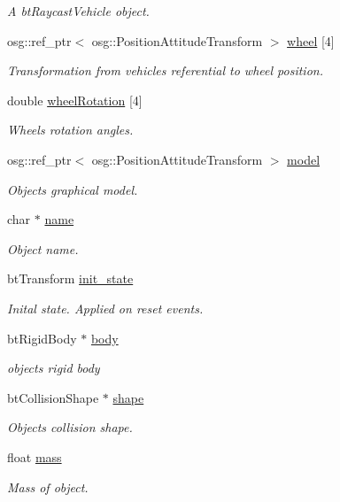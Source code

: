 \begin{DoxyCompactItemize}
\begin{DoxyCompactList}\small\item\em A bt\+Raycast\+Vehicle object. \end{DoxyCompactList}\item 
osg\+::ref\+\_\+ptr$<$ osg\+::\+Position\+Attitude\+Transform $>$ \mbox{\hyperlink{classbtosgVehicle_a37edb4c28551037829ffd79c7bc315ba}{wheel}} \mbox{[}4\mbox{]}
\begin{DoxyCompactList}\small\item\em Transformation from vehicle\textquotesingle{}s referential to wheel position. \end{DoxyCompactList}\item 
double \mbox{\hyperlink{classbtosgVehicle_a0a9cd6f2c9b0defc44cd5e2e8d597418}{wheel\+Rotation}} \mbox{[}4\mbox{]}
\begin{DoxyCompactList}\small\item\em Wheels\textquotesingle{} rotation angles. \end{DoxyCompactList}\item 
osg\+::ref\+\_\+ptr$<$ osg\+::\+Position\+Attitude\+Transform $>$ \mbox{\hyperlink{classbtosgObject_afd15726e7a214212d6d5815f8ac1ac6c}{model}}
\begin{DoxyCompactList}\small\item\em Object\textquotesingle{}s graphical model. \end{DoxyCompactList}\item 
char $\ast$ \mbox{\hyperlink{classbtosgObject_a12396e1362797a75473a2e833b579cc9}{name}}
\begin{DoxyCompactList}\small\item\em Object name. \end{DoxyCompactList}\item 
bt\+Transform \mbox{\hyperlink{classbtosgObject_a2dee023f311114e200df9b04c8c1b400}{init\+\_\+state}}
\begin{DoxyCompactList}\small\item\em Inital state. Applied on reset events. \end{DoxyCompactList}\item 
bt\+Rigid\+Body $\ast$ \mbox{\hyperlink{classbtosgObject_a64ccde0543c184ed1749fdb9c9699785}{body}}
\begin{DoxyCompactList}\small\item\em object\textquotesingle{}s rigid body \end{DoxyCompactList}\item 
bt\+Collision\+Shape $\ast$ \mbox{\hyperlink{classbtosgObject_a0f6a8da01cf643c321bffe86e42604b0}{shape}}
\begin{DoxyCompactList}\small\item\em Object\textquotesingle{}s collision shape. \end{DoxyCompactList}\item 
float \mbox{\hyperlink{classbtosgObject_a2418bb2194d5e9b0f1c51c84672ba7d1}{mass}}
\begin{DoxyCompactList}\small\item\em Mass of object. \end{DoxyCompactList}\end{DoxyCompactItemize}


